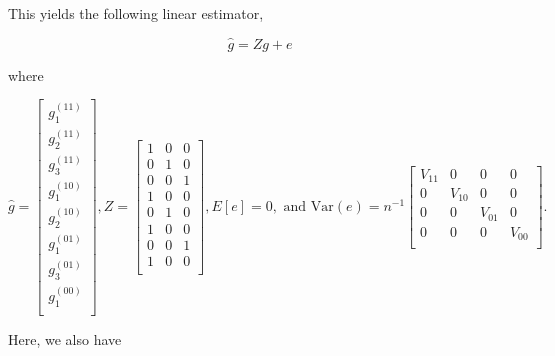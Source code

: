 \documentclass[
  letterpaper,
  DIV=11,
  numbers=noendperiod]{scrartcl}
\newcommand{\Var}{{\text{Var}}}
\begin{document}
This yields the following linear estimator,

\[ \hat g = Zg + e \]

where

\[\hat g = 
\begin{bmatrix}
g_1^{(11)} \\
g_2^{(11)} \\
g_3^{(11)} \\
g_1^{(10)} \\
g_2^{(10)} \\
g_1^{(01)} \\
g_3^{(01)} \\
g_1^{(00)} \\
\end{bmatrix},
Z = 
\begin{bmatrix}
1 & 0 & 0 \\
0 & 1 & 0 \\
0 & 0 & 1 \\
1 & 0 & 0 \\
0 & 1 & 0 \\
1 & 0 & 0 \\
0 & 0 & 1 \\
1 & 0 & 0 \\
\end{bmatrix},
E[e] = 0,
\text{ and } 
\Var(e) = n^{-1}
\begin{bmatrix}
V_{11} & 0 & 0 & 0 \\
0 & V_{10} & 0 & 0 \\
0 & 0 & V_{01} & 0 \\
0 & 0 & 0 & V_{00} \\
\end{bmatrix}.
\]

Here, we also have
\end{document}
